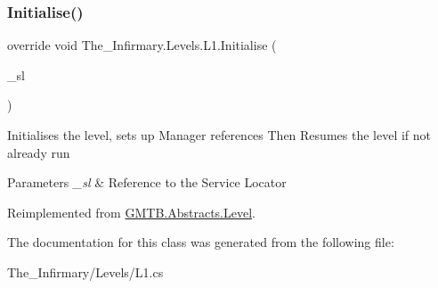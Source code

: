 \subsubsection{\texorpdfstring{Initialise()}{Initialise()}}
{\footnotesize\ttfamily override void The\+\_\+\+Infirmary.\+Levels.\+L1.\+Initialise (\begin{DoxyParamCaption}\item[{\mbox{\hyperlink{interface_g_m_t_b_1_1_interfaces_1_1_i_service_locator}{I\+Service\+Locator}}}]{\+\_\+sl }\end{DoxyParamCaption})\hspace{0.3cm}{\ttfamily [virtual]}}



Initialises the level, sets up Manager references Then Resumes the level if not already run 


\begin{DoxyParams}{Parameters}
{\em \+\_\+sl} & Reference to the Service Locator \\
\hline
\end{DoxyParams}


Reimplemented from \mbox{\hyperlink{class_g_m_t_b_1_1_abstracts_1_1_level_a0048401bb0fb66b0fb0c19b3b25e4265}{G\+M\+T\+B.\+Abstracts.\+Level}}.



The documentation for this class was generated from the following file\+:\begin{DoxyCompactItemize}
\item 
The\+\_\+\+Infirmary/\+Levels/L1.\+cs\end{DoxyCompactItemize}
